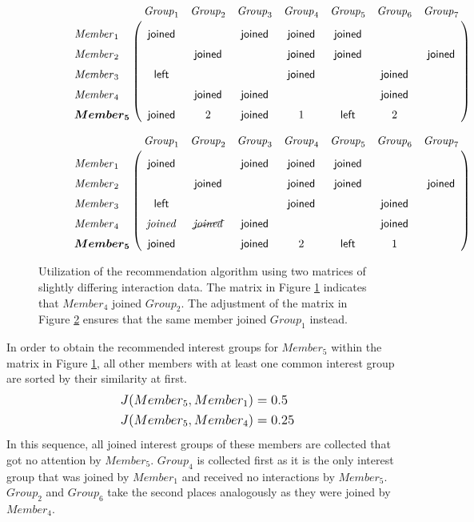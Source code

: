 \documentclass[12pt,numbers=noenddot,parskip,bibliography=totocnumbered,listof=totocnumbered,draft]{scrreprt}
\begin{document}
\begin{figure}
\begin{subfigure}[t]{\textwidth}%
\centering
$\bordermatrix{~ & \mathit{Group}_1 & \mathit{Group}_2 & \mathit{Group}_3 & \mathit{Group}_4 & \mathit{Group}_5 & \mathit{Group}_6 & \mathit{Group}_7 \cr
\vphantom{\vdots}\mathit{Member}_1 & \mathsf{joined} & & \mathsf{joined} & \mathsf{joined} & \mathsf{joined} & & \cr
\vphantom{\vdots}\mathit{Member}_2 &  & \mathsf{joined} & & \mathsf{joined} & \mathsf{joined} & & \mathsf{joined} \cr
\vphantom{\vdots}\mathit{Member}_3 & \mathsf{left} & & & \mathsf{joined} & & \mathsf{joined} & \cr
\vphantom{\vdots}\mathit{Member}_4 & & \mathsf{joined} & \mathsf{joined} & & & \mathsf{joined} & \cr
\vphantom{\vdots}\bm{{Member}_5} & \mathsf{joined} & 2 & \mathsf{joined} & 1 & \mathsf{left} & 2 & \cr  }$
\caption{}
\label{utilizealgorithm0}
\end{subfigure}%

\bigskip

\begin{subfigure}[b]{\textwidth}%
\centering
$\bordermatrix{~ & \mathit{Group}_1 & \mathit{Group}_2 & \mathit{Group}_3 & \mathit{Group}_4 & \mathit{Group}_5 & \mathit{Group}_6 & \mathit{Group}_7 \cr
\vphantom{\vdots}\mathit{Member}_1 & \mathsf{joined} & & \mathsf{joined} & \mathsf{joined} & \mathsf{joined} & & \cr
\vphantom{\vdots}\mathit{Member}_2 &  & \mathsf{joined} & & \mathsf{joined} & \mathsf{joined} & & \mathsf{joined} \cr
\vphantom{\vdots}\mathit{Member}_3 & \mathsf{left} & & & \mathsf{joined} & & \mathsf{joined} & \cr
\vphantom{\vdots}\mathit{Member}_4 & \mathit{joined} & \cancel{\mathit{joined}} & \mathsf{joined} & & & \mathsf{joined} & \cr
\vphantom{\vdots}\bm{{Member}_5} & \mathsf{joined} & & \mathsf{joined} & 2 & \mathsf{left} & 1 & \cr  }$
\caption{}
\label{utilizealgorithm1}
\end{subfigure}%
\caption[Utilization of the recommendation algorithm]{Utilization of the recommendation algorithm using two matrices of slightly differing interaction data. The matrix in Figure \ref{utilizealgorithm0} indicates that $\mathit{Member}_4$ joined $\mathit{Group}_2$. The adjustment of the matrix in Figure \ref{utilizealgorithm1} ensures that the same member joined $\mathit{Group}_1$ instead.}
\label{utilizealgorithm}
\end{figure}

In order to obtain the recommended interest groups for $\mathit{Member}_5$ within the matrix in Figure \ref{utilizealgorithm0}, all other members with at least one common interest group are sorted by their similarity at first.
\begin{align*}
& \mathlarger{J(Member_5, Member_1) = 0.5} \\
& \mathlarger{J(Member_5, Member_4) = 0.25}
\end{align*}
In this sequence, all joined interest groups of these members are collected that got no attention by $\mathit{Member}_5$. $\mathit{Group}_4$ is collected first as it is the only interest group that was joined by $\mathit{Member}_1$ and received no interactions by $\mathit{Member}_5$. $\mathit{Group}_2$ and $\mathit{Group}_6$ take the second places analogously as they were joined by $\mathit{Member}_4$.
\end{document}
